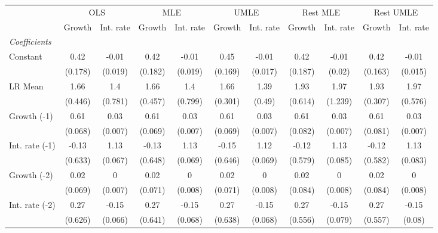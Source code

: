 \begin{table}[htbp] 
	\centering
	\begin{tabular}{@{\extracolsep{4pt}}lcccccccccc@{}}		\hline\hline
		 		 & \multicolumn{2}{c}{OLS} &\multicolumn{2}{c}{MLE} &\multicolumn{2}{c}{UMLE} &\multicolumn{2}{c}{Rest MLE} &\multicolumn{2}{c}{Rest UMLE} \\ 
 		 & Growth 	 & Int. rate 	 & Growth 	 & Int. rate 	 & Growth 	 & Int. rate 	 & Growth 	 & Int. rate 	 & Growth 	 & Int. rate\\\cline{2-3}\cline{4-5}\cline{6-7}\cline{8-9}\cline{10-11}
\rule{0pt}{4ex} 
 \emph{Coefficients} 	  		 & 		 & 		 & 		 & 		 & 		 & 		 & 		 & 		 & 		 &\\ 
\quad Constant 	 & 0.42 	 & -0.01 	 & 0.42 	 & -0.01 	 & 0.45 	 & -0.01 	 & 0.42 	 & -0.01 	 & 0.42 	 & -0.01	 \\ 
 		 & (0.178) 	 & (0.019) 	 & (0.182) 	 & (0.019) 	 & (0.169) 	 & (0.017) 	 & (0.187) 	 & (0.02) 	 & (0.163) 	 & (0.015) 	 \\ 
\quad LR Mean 	 & 1.66 	 & 1.4 	 & 1.66 	 & 1.4 	 & 1.66 	 & 1.39 	 & 1.93 	 & 1.97 	 & 1.93 	 & 1.97	 \\ 
 		 & (0.446) 	 & (0.781) 	 & (0.457) 	 & (0.799) 	 & (0.301) 	 & (0.49) 	 & (0.614) 	 & (1.239) 	 & (0.307) 	 & (0.576) 	 \\ 
\quad Growth (-1) 	 &0.61 	 & 0.03 	 & 0.61 	 & 0.03 	 & 0.61 	 & 0.03 	 & 0.61 	 & 0.03 	 & 0.61 	 & 0.03	 \\ 
 		 & (0.068) 	 & (0.007) 	 & (0.069) 	 & (0.007) 	 & (0.069) 	 & (0.007) 	 & (0.082) 	 & (0.007) 	 & (0.081) 	 & (0.007) 	 \\ 
\quad Int. rate (-1) 	 &-0.13 	 & 1.13 	 & -0.13 	 & 1.13 	 & -0.15 	 & 1.12 	 & -0.12 	 & 1.13 	 & -0.12 	 & 1.13	 \\ 
 		 & (0.633) 	 & (0.067) 	 & (0.648) 	 & (0.069) 	 & (0.646) 	 & (0.069) 	 & (0.579) 	 & (0.085) 	 & (0.582) 	 & (0.083) 	 \\ 
\quad Growth (-2) 	 &0.02 	 & 0 	 & 0.02 	 & 0 	 & 0.02 	 & 0 	 & 0.02 	 & 0 	 & 0.02 	 & 0	 \\ 
 		 & (0.069) 	 & (0.007) 	 & (0.071) 	 & (0.008) 	 & (0.071) 	 & (0.008) 	 & (0.084) 	 & (0.008) 	 & (0.084) 	 & (0.008) 	 \\ 
\quad Int. rate (-2) 	 &0.27 	 & -0.15 	 & 0.27 	 & -0.15 	 & 0.27 	 & -0.15 	 & 0.27 	 & -0.15 	 & 0.27 	 & -0.15	 \\ 
 		 & (0.626) 	 & (0.066) 	 & (0.641) 	 & (0.068) 	 & (0.638) 	 & (0.068) 	 & (0.556) 	 & (0.079) 	 & (0.557) 	 & (0.08) 	 \\ 

\end{tabular}
\end{table}
